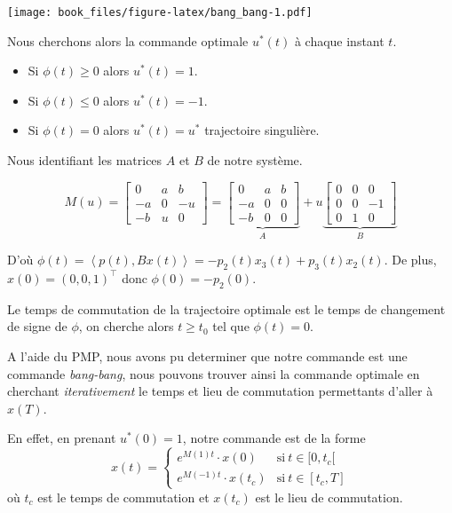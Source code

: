 \documentclass[
  french,
]{article}
\providecommand{\tightlist}{%
  \setlength{\itemsep}{0pt}\setlength{\parskip}{0pt}}
\begin{document}
\texttt{[image: book\_files/figure-latex/bang\_bang-1.pdf]}

Nous cherchons alors la commande optimale \(u^*(t)\)
à chaque instant \(t\).

\begin{itemize}
\tightlist
\item
  Si \(\phi(t)\geq 0\) alors \(u^*(t) = 1\).
\item
  Si \(\phi(t)\leq 0\) alors \(u^*(t) = -1\).
\item
  Si \(\phi(t) = 0\) alors \(u^*(t) = u^*\) trajectoire singulière.
\end{itemize}

Nous identifiant les matrices \(A\) et \(B\) de notre système.

\[ M(u) = \left[\begin{matrix}0 & a & b\\- a & 0 & - u\\- b & u & 0\end{matrix}\right]
    = \underbrace{\left[\begin{matrix}0 & a & b\\- a & 0 & 0\\- b & 0 & 0\end{matrix}\right]}_{A} +u \underbrace{\left[\begin{matrix}0 & 0 & 0\\0 & 0 & -1\\0 & 1 & 0\end{matrix}\right]}_{B}\]

D'où \(\phi(t) = \left\langle p(t){,}Bx(t)\right\rangle = -p_2(t)x_3(t) +p_3(t)x_2(t)\).
De plus, \(x(0)={(0,0,1)}^{\top}\) donc \(\phi(0) = -p_2(0)\).

Le temps de commutation de la trajectoire optimale
est le temps de changement de signe de \(\phi\),
on cherche alors \(t\geq t_0\) tel que \(\phi(t) = 0\).

A l'aide du PMP, nous avons pu determiner que notre commande
est une commande \emph{bang-bang}, nous pouvons trouver ainsi
la commande optimale en cherchant \emph{iterativement}
le temps et lieu de commutation permettants d'aller à \(x(T)\).

En effet, en prenant \(u^*(0)=1\), notre commande est de la forme
\[x(t)=\begin{cases}
    e^{M(1)t}\cdot x(0) &\text{si}~t\in[0,t_c[\\
    e^{M(-1)t}\cdot x(t_c) &\text{si}~t\in[t_c,T]
\end{cases}\]
où \(t_c\) est le temps de commutation et \(x(t_c)\) est le lieu de commutation.
\end{document}

